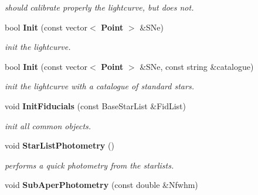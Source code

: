 \begin{CompactItemize}
\begin{CompactList}\small\item\em should calibrate properly the lightcurve, but does not.\item\end{CompactList}\item 
{}
bool {\bf Init} (const vector$<$ {\bf Point} $>$ \&SNe)\label{class_lightcurvebuilder_a6}

\begin{CompactList}\small\item\em init the lightcurve.\item\end{CompactList}\item 
{}
bool {\bf Init} (const vector$<$ {\bf Point} $>$ \&SNe, const string \&catalogue)\label{class_lightcurvebuilder_a7}

\begin{CompactList}\small\item\em init the lightcurve with a catalogue of standard stars.\item\end{CompactList}\item 
{}
void {\bf Init\-Fiducials} (const Base\-Star\-List \&Fid\-List)\label{class_lightcurvebuilder_a8}

\begin{CompactList}\small\item\em init all common objects.\item\end{CompactList}\item 
{}
void {\bf Star\-List\-Photometry} ()\label{class_lightcurvebuilder_a9}

\begin{CompactList}\small\item\em performs a quick photometry from the starlists.\item\end{CompactList}\item 
{}
void {\bf Sub\-Aper\-Photometry} (const double \&Nfwhm)\label{class_lightcurvebuilder_a10}


\end{CompactItemize}
